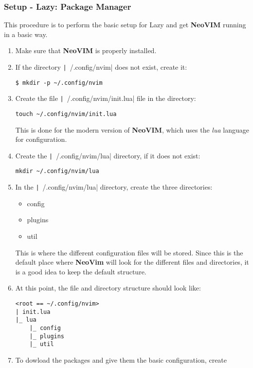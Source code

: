 \subsubsection{Setup - Lazy: Package Manager}
This procedure is to perform the basic setup for Lazy and get \textbf{NeoVIM}
running in a basic way.
\begin{enumerate}
    \item Make sure that \textbf{NeoVIM} is properly installed.
    \item If the directory \texttt|~/.config/nvim| does not exist,
    create it:
    \begin{verbatim}
$ mkdir -p ~/.config/nvim
    \end{verbatim}
    \item Create the file \texttt|~/.config/nvim/init.lua| file in the
    directory:
    \begin{verbatim}
touch ~/.config/nvim/init.lua
    \end{verbatim}
    This is done for the modern version of \textbf{NeoVIM}, which uses the
    \textit{lua} language for configuration.
    \item Create the \texttt|~/.config/nvim/lua| directory, if
    it does not exist:
    \begin{verbatim}
mkdir ~/.config/nvim/lua
    \end{verbatim}
    \item In the \texttt|~/.config/nvim/lua| directory, create the
    three directories:
    \begin{itemize}
        \item config
        \item plugins
        \item util
    \end{itemize}
    This is where the different configuration files will be stored. Since
    this is the default place where \textbf{NeoVim} will look for the different
    files and directories, it is a good idea to keep the default structure.
    \item At this point, the file and directory structure should look like:
    \begin{verbatim}
<root == ~/.config/nvim>
| init.lua
|_ lua
    |_ config
    |_ plugins
    |_ util
    \end{verbatim}
    \item To dowload the packages and give them the basic configuration, create

\end{enumerate}
